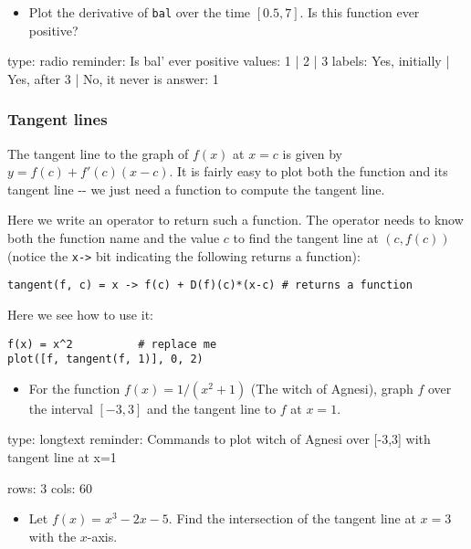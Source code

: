 \documentclass[12pt]{article}
\begin{document}
\begin{itemize}
\itemsep1pt\parskip0pt
\item
  Plot the derivative of \texttt{bal} over the time $[0.5, 7]$. Is this
  function ever positive?
\end{itemize}

\begin{answer}
type: radio
reminder: Is bal' ever positive
values: 1 | 2 | 3
labels: Yes, initially | Yes, after 3 | No, it never is
answer: 1
\end{answer}

\subsubsection{Tangent lines}

The tangent line to the graph of $f(x)$ at $x=c$ is given by
$y = f(c) + f'(c)(x-c)$. It is fairly easy to plot both the function and
its tangent line -{}- we just need a function to compute the tangent
line.

Here we write an operator to return such a function. The operator needs
to know both the function name and the value $c$ to find the tangent
line at $(c, f(c))$ (notice the \texttt{x-\textgreater{}} bit indicating
the following returns a function):



\begin{verbatim}
tangent(f, c) = x -> f(c) + D(f)(c)*(x-c) # returns a function
\end{verbatim}
Here we see how to use it:



\begin{verbatim}
f(x) = x^2          # replace me
plot([f, tangent(f, 1)], 0, 2)
\end{verbatim}
\begin{itemize}
\itemsep1pt\parskip0pt
\item
  For the function $f(x) = 1/(x^2 + 1)$ (The witch of Agnesi), graph $f$
  over the interval $[-3,3]$ and the tangent line to $f$ at $x=1$.
\end{itemize}

\begin{answer}
type: longtext
reminder: Commands to plot witch of Agnesi over [-3,3] with tangent line at x=1

rows: 3
cols: 60
\end{answer}

\begin{itemize}
\itemsep1pt\parskip0pt
\item
  Let $f(x) = x^3 -2x - 5$. Find the intersection of the tangent line at
  $x=3$ with the $x$-axis.
\end{itemize}
\end{document}
